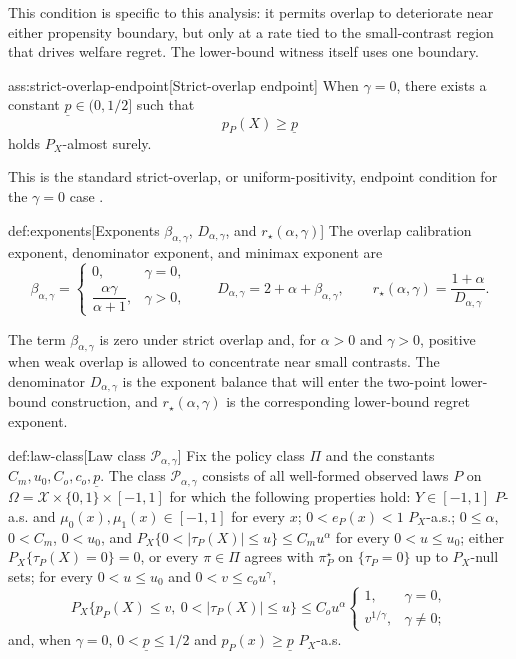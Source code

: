 This condition is specific to this analysis: it permits overlap to deteriorate near either propensity boundary, but only at a rate tied to the small-contrast region that drives welfare regret.  The lower-bound witness itself uses one boundary.

\begin{assumptionv}{ass:strict-overlap-endpoint}[Strict-overlap endpoint]
When \(\gamma=0\), there exists a constant \(\underline p\in(0,1/2]\) such that
\[
p_P(X)\ge \underline p
\]
holds \(P_X\)-almost surely.
\end{assumptionv}

This is the standard strict-overlap, or uniform-positivity, endpoint condition for the \(\gamma=0\) case \citep{Imbens2015}.

\begin{definitionv}{def:exponents}[Exponents $\beta_{\alpha,\gamma}$, $D_{\alpha,\gamma}$, and $r_\star(\alpha,\gamma)$]
The overlap calibration exponent, denominator exponent, and minimax exponent are
\[
\beta_{\alpha,\gamma}
=
\begin{cases}
0, & \gamma=0,\\
\dfrac{\alpha\gamma}{\alpha+1}, & \gamma>0,
\end{cases}
\qquad
D_{\alpha,\gamma}=2+\alpha+\beta_{\alpha,\gamma},
\qquad
r_\star(\alpha,\gamma)=\frac{1+\alpha}{D_{\alpha,\gamma}}.
\]
\end{definitionv}

The term \(\beta_{\alpha,\gamma}\) is zero under strict overlap and, for \(\alpha>0\) and \(\gamma>0\), positive when weak overlap is allowed to concentrate near small contrasts.  The denominator \(D_{\alpha,\gamma}\) is the exponent balance that will enter the two-point lower-bound construction, and \(r_\star(\alpha,\gamma)\) is the corresponding lower-bound regret exponent.

\begin{definitionv}{def:law-class}[Law class \(\mathcal P_{\alpha,\gamma}\)]
Fix the policy class \(\Pi\) and the constants \(C_m,u_0,C_o,c_o,\underline p\). The class \(\mathcal P_{\alpha,\gamma}\) consists of all well-formed observed laws \(P\) on \(\Omega=\mathcal X\times\{0,1\}\times[-1,1]\) for which the following properties hold: \(Y\in[-1,1]\) \(P\)-a.s. and \(\mu_0(x),\mu_1(x)\in[-1,1]\) for every \(x\); \(0<e_P(x)<1\) \(P_X\)-a.s.; \(0\le\alpha\), \(0<C_m\), \(0<u_0\), and \(P_X\{0<|\tau_P(X)|\le u\}\le C_m u^\alpha\) for every \(0<u\le u_0\); either \(P_X\{\tau_P(X)=0\}=0\), or every \(\pi\in\Pi\) agrees with \(\pi^\star_P\) on \(\{\tau_P=0\}\) up to \(P_X\)-null sets; for every \(0<u\le u_0\) and \(0<v\le c_o u^\gamma\), \[P_X\{p_P(X)\le v,\ 0<|\tau_P(X)|\le u\}\le C_o u^\alpha\begin{cases}1,&\gamma=0,\\ v^{1/\gamma},&\gamma\ne0;\end{cases}\] and, when \(\gamma=0\), \(0<\underline p\le1/2\) and \(p_P(x)\ge\underline p\) \(P_X\)-a.s.
\end{definitionv}

